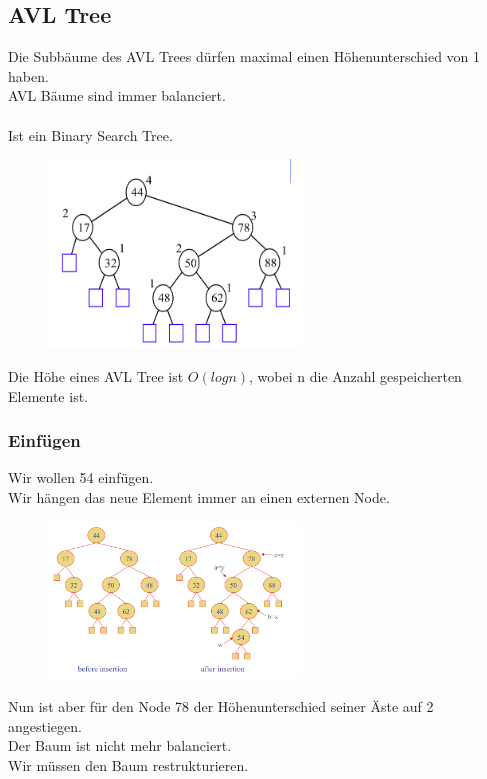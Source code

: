 \documentclass[a4paper,10pt]{report}
\begin{document}
\subsection{AVL Tree}
Die Subbäume des AVL Trees dürfen maximal einen Höhenunterschied von 1 haben.\\
AVL Bäume sind immer balanciert.\\
\\
Ist ein Binary Search Tree.
\begin{figure}[H]
	\begin{center}
  		\includegraphics[width=0.6\textwidth]{img/avltree.png}
	\end{center}
\end{figure}
\noindent
Die Höhe eines AVL Tree ist $O(log n)$, wobei n die Anzahl gespeicherten Elemente ist.
\subsubsection{Einfügen}
Wir wollen 54 einfügen.\\
Wir hängen das neue Element immer an einen externen Node. 
\begin{figure}[H]
	\begin{center}
  		\includegraphics[width=0.6\textwidth]{img/avltreeinsertion.png}
	\end{center}
\end{figure}
\noindent
Nun ist aber für den Node 78 der Höhenunterschied seiner Äste auf 2 angestiegen.\\
Der Baum ist nicht mehr balanciert.\\
Wir müssen den Baum restrukturieren.
\end{document}
